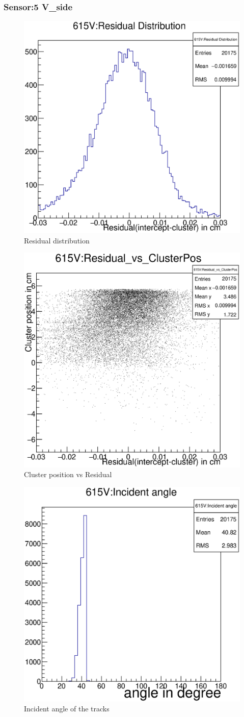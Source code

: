 \documentclass[12pt]{article}
\begin{document}
	\subsubsection{Sensor:5 V\_side}
	\begin{multicols}{3}
		\begin{figure}[H]
			\includegraphics[width=.3\textwidth]{615V:residualplot.eps}	
			\caption{Residual distribution}	
			\label{fig1}	
		\end{figure}
		\begin{figure}[H]
			\includegraphics[width=.3\textwidth]{615V:residual_vs_clusterpos.eps}	
			\caption{Cluster position vs Residual}	
			\label{fig2}	
		\end{figure}
		\begin{figure}[H]
			\includegraphics[width=.3\textwidth]{615V:incident_angle.eps}	
			\caption{Incident angle of the tracks}	
			\label{fig2}	
		\end{figure}
	\end{multicols}
	
\end{document}
